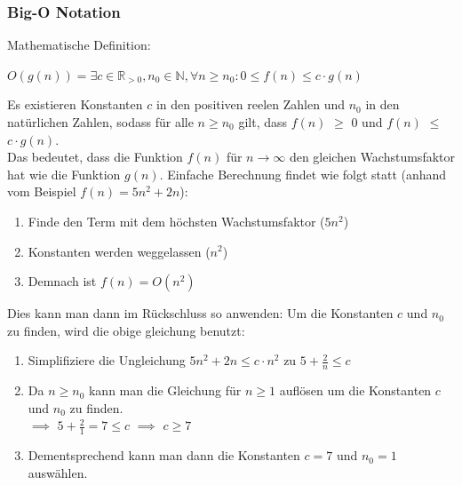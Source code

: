 \documentclass[ngerman,
color=3b,
load_common, %
boxarc,
main,
tikz,
border=3mm
]{article}
\begin{document}
\subsubsection{Big-O Notation}
Mathematische Definition: 
\begin{center}
    $O(g(n)) = \exists c \in \mathbb{R}_{>0}, n_0 \in \mathbb{N}, \forall n \geq n_0:  0 \leq f(n) \leq c \cdot g(n)$
\end{center}
Es existieren Konstanten $c$ in den positiven reelen Zahlen und $n_0$ in den natürlichen Zahlen, sodass für alle $n \geq n_0$ gilt, dass  $f(n)$ \color{teal}$\geq$ \color{black} 0 und $f(n)$ \color{red}$\leq$ \color{black}$c \cdot g(n)$. \\
Das bedeutet, dass die Funktion $f(n)$ für $n \to \infty$ den gleichen Wachstumsfaktor hat wie die Funktion $g(n)$.
Einfache Berechnung findet wie folgt statt (anhand vom Beispiel $f(n) = 5n^2 + 2n$):
\begin{enumerate}
    \item Finde den Term mit dem höchsten Wachstumsfaktor ($5n^2$)
    \item Konstanten werden weggelassen ($n^2$)
    \item Demnach ist $f(n) = O(n^2)$
\end{enumerate}
Dies kann man dann im Rückschluss so anwenden:
Um die Konstanten $c$ und $n_0$ zu finden, wird die obige gleichung benutzt:
\begin{enumerate}
    \item Simplifiziere die Ungleichung $5n^2 + 2n \leq c \cdot n^2$ zu $5 + \frac{2}{n} \leq c$
    \item Da $n \geq n_0$ kann man die Gleichung für $n \geq 1$ auflösen um die Konstanten $c$ und $n_0$ zu finden. \\
    $\implies$ $5 + \frac{2}{1} = 7 \leq c$ $\implies$ $c \geq 7$
    \item Dementsprechend kann man dann die Konstanten $c = 7$ und $n_0 = 1$ auswählen.
\end{enumerate}

\newpage
\end{document}
